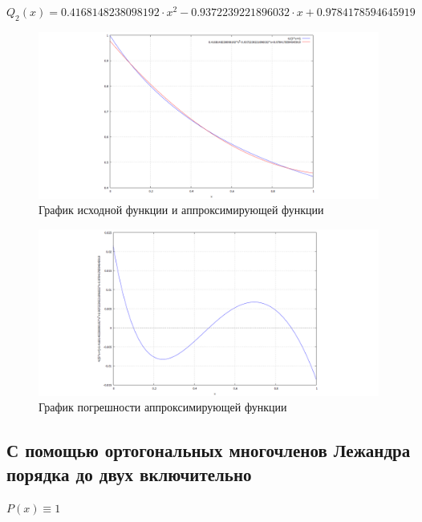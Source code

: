 \begin{displaymath}
Q_2(x) = 0.4168148238098192 \cdot x^2 - 0.9372239221896032 \cdot x + 0.9784178594645919
\end{displaymath}

\begin{figure}[H]
	\begin{center}
		\includegraphics[width=19cm]{ortonorm.png}
		\caption{График исходной функции и аппроксимирующей функции} 
		\label{pic:2:2:1}
	\end{center}
\end{figure}

\begin{figure}[H]
	\begin{center}
		\includegraphics[width=19cm]{e_ortonorm.png}
		\caption{График погрешности аппроксимирующей функции} 
		\label{pic:2:2:2}
	\end{center}
\end{figure}

\subsection{С помощью ортогональных многочленов Лежандра порядка до двух включительно}

$P(x) \equiv 1$


